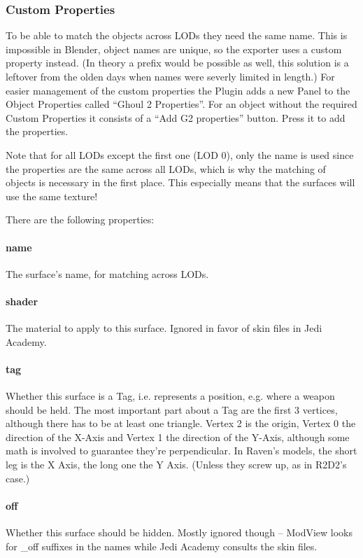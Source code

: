 \documentclass[a4paper,10pt]{article}
\begin{document}
 \subsubsection{Custom Properties}
 
 To be able to match the objects across LODs they need the same name. This is impossible in Blender, object
 names are unique, so the exporter uses a custom property instead. (In theory a prefix would be possible as
 well, this solution is a leftover from the olden days when names were severly limited in length.) For easier
 management of the custom properties the Plugin adds a new Panel to the Object Properties called ``Ghoul 2
 Properties''. For an object without the required Custom Properties it consists of a ``Add G2 properties'' button.
 Press it to add the properties.
 
 Note that for all LODs except the first one (LOD 0), only the name is used since the properties are
 the same across all LODs, which is why the matching of objects is necessary in the first place. This
 especially means that the surfaces will use the same texture!
 
 There are the following properties:
 
 \paragraph*{name}
 The surface's name, for matching across LODs.
 
 \paragraph*{shader}
 The material to apply to this surface. Ignored in favor of skin files in Jedi Academy.
 
 \paragraph*{tag}
 Whether this surface is a Tag, i.e. represents a position, e.g. where a weapon should be held. The most
 important part about a Tag are the first 3 vertices, although there has to be at least one triangle. Vertex 2
 is the origin, Vertex 0 the direction of the X-Axis and Vertex 1 the direction of the Y-Axis, although some
 math is involved to guarantee they're perpendicular. In Raven's models, the short leg is the X Axis, the
 long one the Y Axis. (Unless they screw up, as in R2D2's case.)
 
 \paragraph*{off}
 Whether this surface should be hidden. Mostly ignored though -- ModView looks for \_off suffixes in the names
 while Jedi Academy consults the skin files.
 
\end{document}
